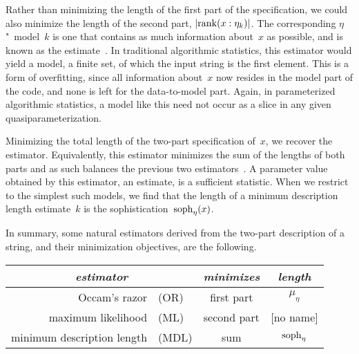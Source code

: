 Rather than minimizing the length of the first part of the specification, we could also minimize the length of the second part, ${\lvert\operatorname{rank}(x : \eta_k)\rvert}$.
The corresponding $\eta$"~model~$k$ is one that contains as much information about~$x$ as possible, and is known as the  estimate~\parencite{vereshchagin2004kolmogorov}.
In traditional algorithmic statistics, this estimator would yield a model, a finite set, of which the input string is the first element.
This is a form of overfitting, since all information about~$x$ now resides in the model part of the code, and none is left for the data-to-model part.
Again, in parameterized algorithmic statistics, a model like this need not occur as a slice in any given quasiparameterization.

Minimizing the total length of the two-part specification of~$x$, we recover the  estimator.
Equivalently, this estimator minimizes the sum of the lengths of both parts and as such balances the previous two estimators~\parencite{vereshchagin2004kolmogorov,rissanen1983universal}.
A parameter value obtained by this estimator, an estimate, is a sufficient statistic.
When we restrict to the simplest such models, we find that the length of a minimum description length estimate~$k$ is the sophistication~$\operatorname{soph}_\eta(x)$.

In summary, some natural estimators derived from the two-part description of a string, and their minimization objectives, are the following.
\begin{center}
  \begin{tabular}{r@{ }lcc}
    \multicolumn{2}{c}{\emph{estimator}}	& \emph{minimizes}	& \emph{length} \\
    \hline
    Occam's razor&(OR)	& first part	& $\mu_\eta$ \\
    maximum likelihood&(ML)	& second part	& \footnotesize{[no name]} \\
    minimum description length&(MDL)	& sum	& $\operatorname{soph}_\eta$
  \end{tabular}
\end{center}

